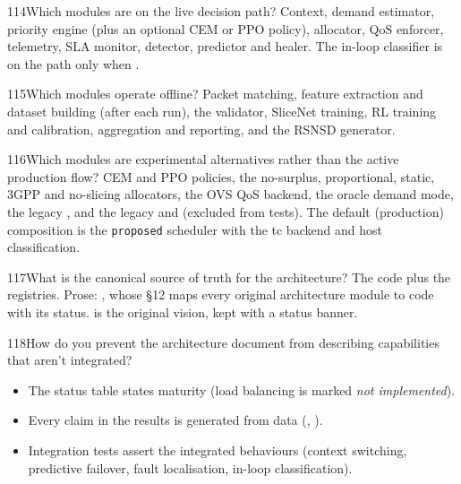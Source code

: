 \begin{qa}{114}{Which modules are on the live decision path?}
Context, demand estimator, priority engine (plus an optional CEM or PPO policy), allocator, QoS enforcer, telemetry,
SLA monitor, detector, predictor and healer. The in-loop classifier is on the path only when
.
\end{qa}

\begin{qa}{115}{Which modules operate offline?}
Packet matching, feature extraction and dataset building (after each run), the validator, SliceNet training, RL
training and calibration, aggregation and reporting, and the RSNSD generator.
\end{qa}

\begin{qa}{116}{Which modules are experimental alternatives rather than the active production flow?}
CEM and PPO policies, the no-surplus, proportional, static, 3GPP and no-slicing allocators, the OVS QoS backend, the
oracle demand mode, the legacy , and the legacy  and 
(excluded from tests). The default (production) composition is the \texttt{proposed} scheduler with the tc backend
and host classification.
\end{qa}

\begin{qa}{117}{What is the canonical source of truth for the architecture?}
The code plus the registries. Prose: , whose §12 maps every original architecture module to
code with its status.  is the original vision, kept with a status banner.
\end{qa}

\begin{qa}{118}{How do you prevent the architecture document from describing capabilities that aren't integrated?}
\begin{itemize}
\item The status table states maturity (load balancing is marked \emph{not implemented}).
\item Every claim in the results is generated from data (, ).
\item Integration tests assert the integrated behaviours (context switching, predictive failover, fault localisation,
in-loop classification).
\end{itemize}
\end{qa}

